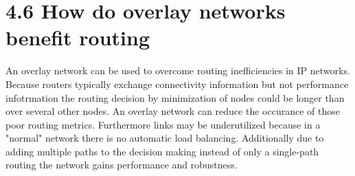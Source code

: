 \documentclass{article}
\begin{document}
	\section*{4.6 How do overlay networks benefit routing}
	\begin{adjustwidth}{2em}{2em}
		An overlay network can be used to overcome routing inefficiencies in IP networks. Because routers typically exchange connectivity information but not performance infotrmation the routing decision by minimization of nodes could be longer than over several other nodes. An overlay network can reduce the occurance of those poor routing metrics. Furthermore links may be underutilized because in a "normal" network there is no automatic load balancing. Additionally due to adding multiple paths to the decision making instead of only a single-path routing the network gains performance and robustness.
	\end{adjustwidth}
\end{document}
